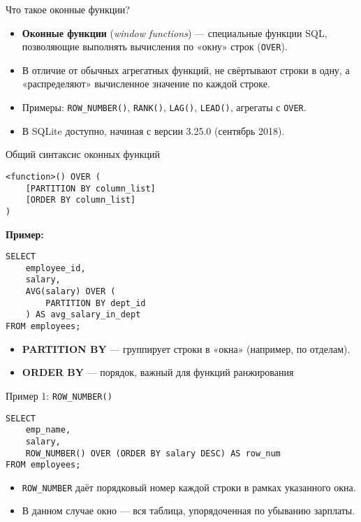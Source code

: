 \documentclass{beamer}
\begin{document}
\begin{frame}{Что такое оконные функции?}
	\begin{itemize}
		\item \textbf{Оконные функции} (\textit{window functions}) — специальные функции SQL,
		      позволяющие выполнять вычисления по «окну» строк (\texttt{OVER}).
		\item В отличие от обычных агрегатных функций, не свёртывают строки в одну, а «распределяют» вычисленное значение по каждой строке.
		\item Примеры: \texttt{ROW\_NUMBER()}, \texttt{RANK()}, \texttt{LAG()}, \texttt{LEAD()}, агрегаты с \texttt{OVER}.
		\item В SQLite доступно, начиная с версии 3.25.0 (сентябрь 2018).
	\end{itemize}
\end{frame}

\begin{frame}[fragile]{Общий синтаксис оконных функций}
	\begin{verbatim}
<function>() OVER (
    [PARTITION BY column_list]
    [ORDER BY column_list]
)
\end{verbatim}

	\textbf{Пример:}
	\begin{verbatim}
SELECT
    employee_id,
    salary,
    AVG(salary) OVER (
        PARTITION BY dept_id
    ) AS avg_salary_in_dept
FROM employees;
\end{verbatim}

	\begin{itemize}
		\item \textbf{PARTITION BY} — группирует строки в «окна» (например, по отделам).
		\item \textbf{ORDER BY} — порядок, важный для функций ранжирования
	\end{itemize}
\end{frame}

\begin{frame}[fragile]{Пример 1: \texttt{ROW\_NUMBER()}}
	\begin{verbatim}
SELECT
    emp_name,
    salary,
    ROW_NUMBER() OVER (ORDER BY salary DESC) AS row_num
FROM employees;
\end{verbatim}
	\begin{itemize}
		\item \texttt{ROW\_NUMBER} даёт порядковый номер каждой строки в рамках указанного окна.
		\item В данном случае окно — вся таблица, упорядоченная по убыванию зарплаты.
	\end{itemize}
\end{frame}
\end{document}
